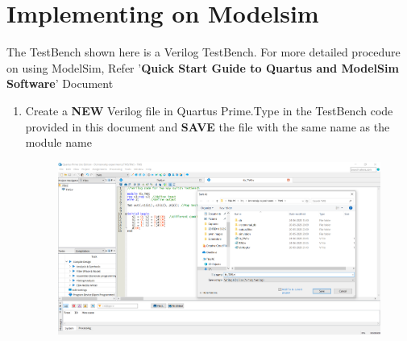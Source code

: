 \documentclass[12pt]{article}
\begin{document}
\begin{enumerate}
\begin{figure}[H]
     \end{figure}
     
 \end{enumerate}

\newpage
\section{Implementing on Modelsim }
The TestBench shown here is a Verilog TestBench. For more detailed procedure on using ModelSim, Refer '\textbf{Quick Start Guide to Quartus and ModelSim Software}' Document
 \begin{enumerate}
     \item Create a \textbf{NEW} Verilog file in Quartus Prime.Type in the TestBench code provided in this document and \textbf{SAVE} the file with the same name as the module name
    \begin{figure}[H]
        \centering
    \includegraphics[width=14cm,keepaspectratio]{twstbadd.png}
    \end{figure}
    \newpage
   

\end{enumerate}
\end{document}
